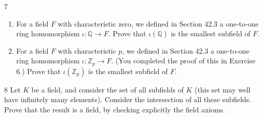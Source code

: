 \begin{problem}{7}
    \begin{enumerate}
        \item[(a)] For a field $F$ with characteristic zero, we defined in
        Section 42.3 a one-to-one ring homomorphism
        $\iota : \mathbb{Q} \to F$. Prove that $\iota(\mathbb{Q})$ is the
        smallest subfield of $F$.
        \item[(b)] For a field $F$ with characteristic $p$, we defined in
        Section 42.3 a one-to-one ring homomorphism
        $\iota : \mathbb{Z}_p \to F$. (You completed the proof of this in
        Exercise 6.) Prove that $\iota(\mathbb{Z}_p)$ is the smallest
        subfield of $F$.
    \end{enumerate}
\end{problem}
\unsolved

\begin{problem}{8}
    Let $K$ be a field, and consider the set of all subfields of $K$ (this
    set may well have infinitely many elements). Consider the intersection
    of all these subfields. Prove that the result is a field, by checking
    explicitly the field axioms.
\end{problem}
\unsolved
